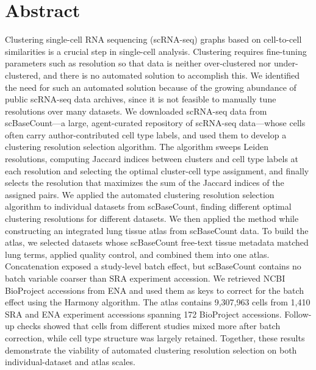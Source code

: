 \documentclass[10pt,letterpaper]{article}
\begin{document}
\section*{Abstract}
Clustering single-cell RNA sequencing (scRNA-seq) graphs based on cell-to-cell similarities is a crucial step in single-cell analysis. Clustering requires fine-tuning parameters such as resolution so that data is neither over-clustered nor under-clustered, and there is no automated solution to accomplish this. We identified the need for such an automated solution because of the growing abundance of public scRNA-seq data archives, since it is not feasible to manually tune resolutions over many datasets. We downloaded scRNA-seq data from scBaseCount---a large, agent-curated repository of scRNA-seq data---whose cells often carry author-contributed cell type labels, and used them to develop a clustering resolution selection algorithm. The algorithm sweeps Leiden resolutions, computing Jaccard indices between clusters and cell type labels at each resolution and selecting the optimal cluster-cell type assignment, and finally selects the resolution that maximizes the sum of the Jaccard indices of the assigned pairs. We applied the automated clustering resolution selection algorithm to individual datasets from scBaseCount, finding different optimal clustering resolutions for different datasets. We then applied the method while constructing an integrated lung tissue atlas from scBaseCount data. To build the atlas, we selected datasets whose scBaseCount free-text tissue metadata matched lung terms, applied quality control, and combined them into one atlas. Concatenation exposed a study-level batch effect, but scBaseCount contains no batch variable coarser than SRA experiment accession. We retrieved NCBI BioProject accessions from ENA and used them as keys to correct for the batch effect using the Harmony algorithm. The atlas contains 9,307,963 cells from 1,410 SRA and ENA experiment accessions spanning 172 BioProject accessions. Follow-up checks showed that cells from different studies mixed more after batch correction, while cell type structure was largely retained. Together, these results demonstrate the viability of automated clustering resolution selection on both individual-dataset and atlas scales.

\end{document}
